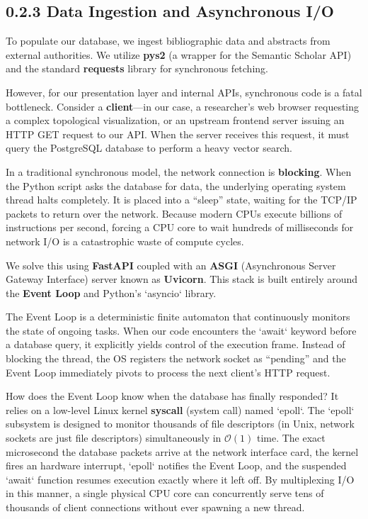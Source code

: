 \subsection*{0.2.3 Data Ingestion and Asynchronous I/O}

To populate our database, we ingest bibliographic data and abstracts from external authorities. We utilize \textbf{pys2} (a wrapper for the Semantic Scholar API) and the standard \textbf{requests} library for synchronous fetching.

However, for our presentation layer and internal APIs, synchronous code is a fatal bottleneck. Consider a \textbf{client}—in our case, a researcher's web browser requesting a complex topological visualization, or an upstream frontend server issuing an HTTP GET request to our API. When the server receives this request, it must query the PostgreSQL database to perform a heavy vector search.

In a traditional synchronous model, the network connection is \textbf{blocking}. When the Python script asks the database for data, the underlying operating system thread halts completely. It is placed into a ``sleep'' state, waiting for the TCP/IP packets to return over the network. Because modern CPUs execute billions of instructions per second, forcing a CPU core to wait hundreds of milliseconds for network I/O is a catastrophic waste of compute cycles.

We solve this using \textbf{FastAPI} coupled with an \textbf{ASGI} (Asynchronous Server Gateway Interface) server known as \textbf{Uvicorn}. This stack is built entirely around the \textbf{Event Loop} and Python's `asyncio` library.

The Event Loop is a deterministic finite automaton that continuously monitors the state of ongoing tasks. When our code encounters the `await` keyword before a database query, it explicitly yields control of the execution frame. Instead of blocking the thread, the OS registers the network socket as ``pending'' and the Event Loop immediately pivots to process the next client's HTTP request.

How does the Event Loop know when the database has finally responded? It relies on a low-level Linux kernel \textbf{syscall} (system call) named `epoll`. The `epoll` subsystem is designed to monitor thousands of file descriptors (in Unix, network sockets are just file descriptors) simultaneously in $\mathcal{O}(1)$ time. The exact microsecond the database packets arrive at the network interface card, the kernel fires an hardware interrupt, `epoll` notifies the Event Loop, and the suspended `await` function resumes execution exactly where it left off. By multiplexing I/O in this manner, a single physical CPU core can concurrently serve tens of thousands of client connections without ever spawning a new thread.









